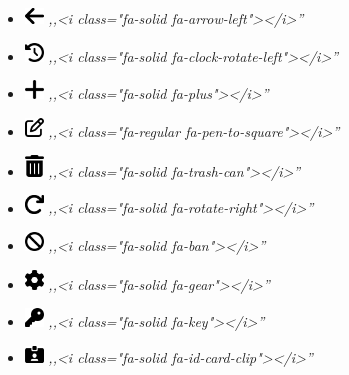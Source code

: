 \documentclass[
]{thesis-ekf}
\theoremstyle{definition}
\theoremstyle{remark}
\begin{document}
	\begin{itemize}
		\item \includegraphics[width=0.5cm]{./src/icons/arrow-left-solid}
		 	\emph{,,<i class="fa-solid fa-arrow-left"></i>''}
		
		\item \includegraphics[width=0.5cm]{./src/icons/clock-rotate-left-solid} 
			\emph{,,<i class="fa-solid fa-clock-rotate-left"></i>''}
			
		\item \includegraphics[width=0.5cm]{./src/icons/plus-solid} 
			\emph{,,<i class="fa-solid fa-plus"></i>''}
		
		\item \includegraphics[width=0.5cm]{./src/icons/pen-to-square-regular}
			\emph{,,<i class="fa-regular fa-pen-to-square"></i>''}
			
		\item \includegraphics[width=0.5cm]{./src/icons/trash-can-solid}
			\emph{,,<i class="fa-solid fa-trash-can"></i>''}
			
		\item \includegraphics[width=0.5cm]{./src/icons/arrow-rotate-right-solid}
			\emph{,,<i class="fa-solid fa-rotate-right"></i>''}
		
		\item \includegraphics[width=0.5cm]{./src/icons/ban-solid}
		 	\emph{,,<i class="fa-solid fa-ban"></i>''}
			
		\item \includegraphics[width=0.5cm]{./src/icons/gear-solid}
			\emph{,,<i class="fa-solid fa-gear"></i>''}
			
		\item \includegraphics[width=0.5cm]{./src/icons/key-solid}
			\emph{,,<i class="fa-solid fa-key"></i>''}
			
		\item \includegraphics[width=0.5cm]{./src/icons/id-card-clip-solid}
			\emph{,,<i class="fa-solid fa-id-card-clip"></i>''}
			
	\end{itemize}
\end{document}
